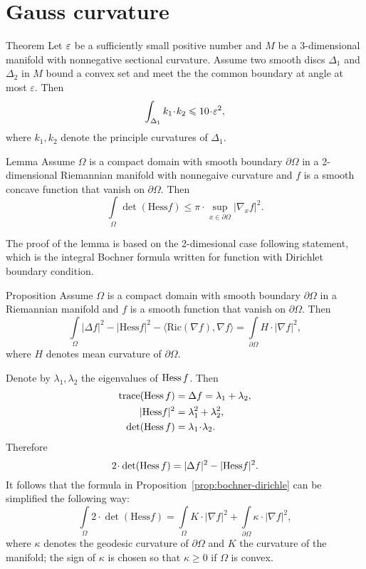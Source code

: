 \section{Gauss curvature}
\label{sec:gauss}

\begin{thm}{Theorem}\label{thm:lens}
Let $\varepsilon$ be a sufficiently small positive number and 
$M$ be a 3-dimensional manifold with nonnegative sectional curvature.
Assume two smooth discs $\Delta_1$ and $\Delta_2$ in $M$ bound a convex set and meet the the common boundary at angle at most $\varepsilon$.
Then 
\[\int_{\Delta_1}k_1\cdot k_2\le 10\cdot \eps^2,\]
where $k_1,k_2$ denote the principle curvatures of $\Delta_1$.
\end{thm}

\begin{thm}{Lemma}\label{lem:bochner}
Assume $\Omega$ is a compact domain with smooth boundary $\partial \Omega$ in a 2-dimensional Riemannian manifold with nonnegaive curvature
and $f$ is a smooth concave function that vanish on $\partial \Omega$.
Then
\[\int\limits_\Omega 
\det(\mathrm{Hess}f)
\le\pi\cdot\sup_{x\in\partial\Omega}|\nabla_x f|^2.\]

\end{thm}

The proof of the lemma is based on the 2-dimesional case  following statement,
which is the integral Bochner formula written for function with Dirichlet boundary condition.

\begin{thm}{Proposition}\label{prop:bochner-dirichle}
Assume $\Omega$ is a compact domain with smooth boundary $\partial \Omega$ in a Riemannian manifold
and $f$ is a smooth function that vanish on $\partial \Omega$.
Then
\[\int\limits_\Omega |\Delta f|^2
-|\mathrm{Hess}f|^2
-\langle\mathrm{Ric}(\nabla f),\nabla f\rangle
=\int\limits_{\partial\Omega}
H\cdot|\nabla f|^2,\]
where $H$ denotes mean curvature of $\partial \Omega$.
\end{thm}

Denote by  $\lambda_1,\lambda_2$ the eigenvalues of  $\operatorname{Hess} f$.
Then
\begin{align*}
\trace(\Hess f)&=\Delta f=\lambda_1+\lambda_2,
\\
|\mathrm{Hess}f|^2&=\lambda_1^2+\lambda_2^2,
\\
\det(\Hess f)&=\lambda_1\cdot\lambda_2.
\end{align*}
Therefore 
\[2\cdot\det(\Hess f)
=|\Delta f|^2
-|\mathrm{Hess}f|^2.\] 
It follows that the formula in Proposition~\ref{prop:bochner-dirichle} can be simplified the following way:
\[\int\limits_\Omega 
2\cdot\det(\mathrm{Hess}f)
=\int\limits_\Omega 
K\cdot|\nabla f|^2
+
\int\limits_{\partial\Omega}
\kappa\cdot|\nabla f|^2,\]
where $\kappa$ denotes the geodesic curvature of $\partial \Omega$ and $K$ the curvature of the manifold; the sign of $\kappa$ is chosen so that $\kappa\ge 0$ if $\Omega$ is convex.

